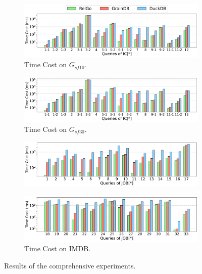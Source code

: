 \begin{figure}[ht]
    \centering
    \begin{subfigure}[b]{\linewidth}
        \centering
        \includegraphics[width=\linewidth]{./figures/exp/e2e_sf10.pdf}
        \vspace{-2em}
        \caption{Time Cost on $G_{sf10}$.}
        \label{fig:exp-e2e-sf10}
    \end{subfigure}
    \begin{subfigure}[b]{\linewidth}
        \centering
        \includegraphics[width=\linewidth]{./figures/exp/e2e_sf30.pdf}
        \vspace{-2em}
        \caption{Time Cost on $G_{sf30}$.}
        \label{fig:exp-e2e-sf30}
    \end{subfigure}
    \begin{subfigure}[b]{\linewidth}
        \centering
        \includegraphics[width=\linewidth]{./figures/exp/e2e_job_part1.pdf}
        \vspace*{-2ex}
    \end{subfigure}
    \begin{subfigure}[b]{\linewidth}
        \centering
        \includegraphics[width=\linewidth]{./figures/exp/e2e_job_part2.pdf}
        \vspace{-2em}
        \caption{Time Cost on IMDB.}
        \label{fig:exp-e2e-job}
    \end{subfigure}
    \caption{Results of the comprehensive experiments.}
    \label{fig:exp-e2e}
\end{figure}

